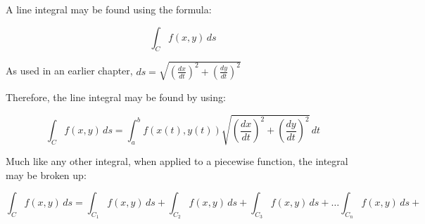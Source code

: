 \documentclass[12pt]{article}
\begin{document}
A line integral may be found using the formula:

$$\int_C f(x,y)\,ds$$

As used in an earlier chapter, $ds=\sqrt{(\frac{dx}{dt})^2+(\frac{dy}{dt})^2}$

Therefore, the line integral may be found by using:

$$\int_C f(x,y)\,ds=\int_a^b f(x(t),y(t)) \sqrt{\left(\frac{dx}{dt}\right)^2+\left(\frac{dy}{dt}\right)^2}\,dt$$

Much like any other integral, when applied to a piecewise function, the integral may be broken up:

$$\int_C f(x,y)\,ds=\int_{C_1} f(x,y)\,ds+\int_{C_2} f(x,y)\,ds+\int_{C_3} f(x,y)\,ds+\dots \int_{C_n} f(x,y)\,ds+$$
\end{document}

